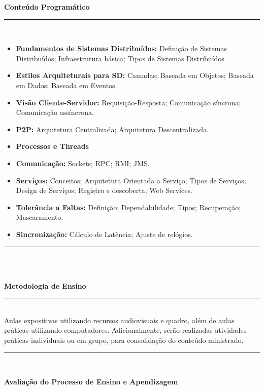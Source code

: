 \begin{center}\textbf{Conteúdo Programático}\end{center}
\noindent\rule{16.2cm}{0.4pt}
\\
\begin{itemize}
 \item \textbf{Fundamentos de Sistemas Distribuídos:} Definição de Sistemas Distribuídos; Infraestrutura básica; Tipos de Sistemas Distribuídos.

 \item \textbf{Estilos Arquiteturais para SD:} Camadas; Baseada em Objetos; Baseada em Dados; Baseada em Eventos.

 \item \textbf{Visão Cliente-Servidor:} Requisição-Resposta; Comunicação síncrona; Comunicação assíncrona.

 \item \textbf{P2P:} Arquitetura Centralizada; Arquitetura Descentralizada.
 \item \textbf{Processos e Threads}
 \item \textbf{Comunicação:} Sockets; RPC; RMI; JMS.

 \item \textbf{Serviços:} Conceitos; Arquitetura Orientada a Serviço; Tipos de Serviços; Design de Serviços; Registro e descoberta; Web Services.

 \item \textbf{Tolerância a Faltas:} Definição; Dependabilidade; Tipos; Recuperação; Mascaramento.
 \item \textbf{Sincronização:} Cálculo de Latência; Ajuste de relógios.
\end{itemize}
\noindent\rule{16.2cm}{0.4pt}\\
\\
\begin{center}\textbf{Metodologia de Ensino}\end{center} 
\noindent\rule{16.2cm}{0.4pt}
\\
   Aulas expositivas utilizando recursos audiovisuais e quadro, além de aulas práticas utilizando computadores. Adicionalmente, serão realizadas atividades práticas individuais ou em grupo, para consolidação do conteúdo ministrado.\\
\noindent\rule{16.2cm}{0.4pt}\\
\begin{center}\textbf{Avaliação do Processo de Ensino e Apendizagem}\end{center}
